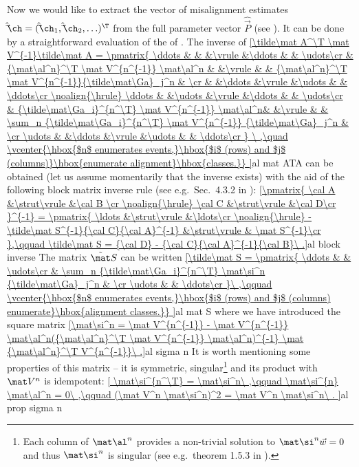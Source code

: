 Now we would like to extract the vector of misalignment estimates $\hat\vec\ch = (\hat\vec\ch_1, \hat\vec\ch_2, \ldots)^\T$ from the full parameter vector $\hat\vec P$ (see ). It can be done by a straightforward evaluation of the \rhs{} of . The inverse of
\eqref{\tilde\mat A^\T \mat V^{-1}\tilde\mat A =
\pmatrix{
\ddots 	& 											& 		&\vrule &\ddots & 														& \udots\cr
	 	& {\mat\al^n}^\T \mat V^{n^{-1}} \mat\al^n	& 		&\vrule & 		& {\mat\al^n}^\T \mat V^{n^{-1}}{\tilde\mat\Ga}_j^n 			& 		\cr
 		& 											&\ddots &\vrule &\udots & 														& \ddots\cr
\noalign{\hrule}
\ddots 	& 											&\udots	&\vrule &\ddots & 														& \udots\cr
	 	& {\tilde\mat\Ga_i}^{n^\T} \mat V^{n^{-1}} \mat\al^n& 		&\vrule & 		& \sum_n {\tilde\mat\Ga_i}^{n^\T} \mat V^{n^{-1}} {\tilde\mat\Ga}_j^n 	& \cr
\udots	& 											&\ddots &\vrule &\udots & 														& \ddots\cr
}
\ ,\quad 
\vcenter{\hbox{$n$ enumerates events,}\hbox{$i$ (rows) and $j$ (columns)}\hbox{enumerate alignment}\hbox{classes.}}
}{al mat ATA}
can be obtained (let us assume momentarily that the inverse exists) with the aid of the following block matrix inverse rule (see e.g.~Sec.~4.3.2 in ):
\eqref{\pmatrix{
	\cal A	&\strut\vrule	&\cal B	\cr
	\noalign{\hrule}
	\cal C	&\strut\vrule	&\cal D\cr
	}^{-1} = \pmatrix{
	\ldots							&\strut\vrule	&\ldots\cr
	\noalign{\hrule}
	-\tilde\mat S^{-1}{\cal C}{\cal A}^{-1}	&\strut\vrule	& \mat S^{-1}\cr
},\qquad \tilde\mat S = {\cal D} - {\cal C}{\cal A}^{-1}{\cal B}\ .}{al block inverse}
The matrix $\tilde\mat S$ can be written
\eqref{\tilde\mat S = \pmatrix{
	\ddots	& 																		& \udots\cr
			& \sum_n {\tilde\mat\Ga_i}^{n^\T} \mat\si^n {\tilde\mat\Ga}_j^n 	& \cr
	\udots	& 																		& \ddots\cr
}\ ,\qquad
\vcenter{\hbox{$n$ enumerates events,}\hbox{$i$ (rows) and $j$ (columns) enumerate}\hbox{alignment classes.}}
}{al mat S}
where we have introduced the square matrix
\eqref{\mat\si^n = \mat V^{n^{-1}} - \mat V^{n^{-1}} \mat\al^n({\mat\al^n}^\T \mat V^{n^{-1}} \mat\al^n)^{-1} \mat {\mat\al^n}^\T V^{n^{-1}}\ .}{al sigma n}
It is worth mentioning some properties of this matrix -- it is symmetric, singular\footnote{%
Each column of $\mat\al^n$ provides a non-trivial solution to $\mat\si^{n} \vec w = 0$ and thus $\mat\si^n$ is singular (see e.g.~theorem 1.5.3 in ).} and its product with $\mat V^n$ is idempotent:
\eqref{
	\mat\si^{n^\T} = \mat\si^n\ ,\qquad
	\mat\si^{n} \mat\al^n = 0\ ,\qquad
	(\mat V^n \mat\si^n)^2 = \mat V^n \mat\si^n\ .
}{al prop sigma n}

